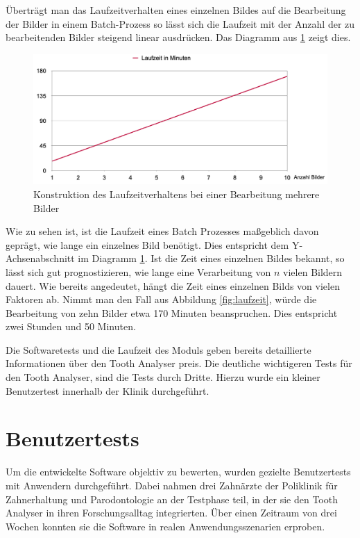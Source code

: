 Überträgt man das Laufzeitverhalten eines einzelnen Bildes auf die Bearbeitung
der Bilder in einem Batch-Prozess so lässt sich die Laufzeit mit der Anzahl der
zu bearbeitenden Bilder steigend linear ausdrücken. Das Diagramm aus \ref{fig:laufzeit_batch}
zeigt dies.

\begin{figure}[h]
	\centering
	\includegraphics[width=1\textwidth]{img/runtimeBatch.png}
	\caption{Konstruktion des Laufzeitverhaltens bei einer Bearbeitung mehrere
	Bilder}
	\label{fig:laufzeit_batch}
\end{figure}

Wie zu sehen ist, ist die Laufzeit eines Batch Prozesses maßgeblich davon geprägt,
wie lange ein einzelnes Bild benötigt. Dies entspricht dem Y-Achsenabschnitt im Diagramm
\ref{fig:laufzeit_batch}. Ist die Zeit eines einzelnen Bildes bekannt, so lässt sich
gut prognostizieren, wie lange eine Verarbeitung von $n$ vielen Bildern dauert. Wie
bereits angedeutet, hängt die Zeit eines einzelnen Bilds von vielen Faktoren ab.
Nimmt man den Fall aus Abbildung \ref{fig:laufzeit}, würde die Bearbeitung von
zehn Bilder etwa 170 Minuten beanspruchen. Dies entspricht zwei Stunden und 50 Minuten.

Die Softwaretests und die Laufzeit des Moduls geben bereits detaillierte Informationen
über den Tooth Analyser preis. Die deutliche wichtigeren Tests für den Tooth
Analyser, sind die Tests durch Dritte. Hierzu wurde ein kleiner Benutzertest
innerhalb der Klinik durchgeführt.

\section{Benutzertests}
\label{sec:benutzertests}Um die entwickelte Software objektiv zu bewerten,
wurden gezielte Benutzertests mit Anwendern durchgeführt. Dabei nahmen drei Zahnärzte
der Poliklinik für Zahnerhaltung und Parodontologie an der Testphase teil, in
der sie den Tooth Analyser in ihren Forschungsalltag integrierten. Über einen Zeitraum
von drei Wochen konnten sie die Software in realen Anwendungsszenarien erproben.

